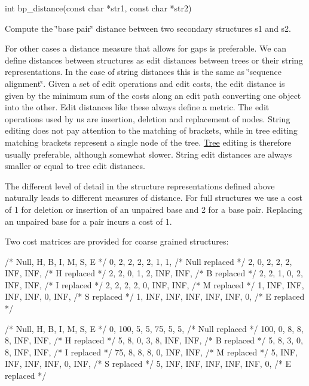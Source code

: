 \begin{DoxyVerb}
int bp_distance(const char *str1,
                const char *str2)
\end{DoxyVerb}
 Compute the \char`\"{}base pair\char`\"{} distance between two secondary structures s1 and s2. 

For other cases a distance measure that allows for gaps is preferable. We can define distances between structures as edit distances between trees or their string representations. In the case of string distances this is the same as \char`\"{}sequence alignment\char`\"{}. Given a set of edit operations and edit costs, the edit distance is given by the minimum sum of the costs along an edit path converting one object into the other. Edit distances like these always define a metric. The edit operations used by us are insertion, deletion and replacement of nodes. String editing does not pay attention to the matching of brackets, while in tree editing matching brackets represent a single node of the tree. \hyperlink{structTree}{Tree} editing is therefore usually preferable, although somewhat slower. String edit distances are always smaller or equal to tree edit distances.

The different level of detail in the structure representations defined above naturally leads to different measures of distance. For full structures we use a cost of 1 for deletion or insertion of an unpaired base and 2 for a base pair. Replacing an unpaired base for a pair incurs a cost of 1.

Two cost matrices are provided for coarse grained structures:

\begin{DoxyVerb}
/*  Null,   H,   B,   I,   M,   S,   E    */
   {   0,   2,   2,   2,   2,   1,   1},   /* Null replaced */
   {   2,   0,   2,   2,   2, INF, INF},   /* H    replaced */
   {   2,   2,   0,   1,   2, INF, INF},   /* B    replaced */
   {   2,   2,   1,   0,   2, INF, INF},   /* I    replaced */
   {   2,   2,   2,   2,   0, INF, INF},   /* M    replaced */
   {   1, INF, INF, INF, INF,   0, INF},   /* S    replaced */
   {   1, INF, INF, INF, INF, INF,   0},   /* E    replaced */


/* Null,   H,   B,   I,   M,   S,   E   */
   {   0, 100,   5,   5,  75,   5,   5},   /* Null replaced */
   { 100,   0,   8,   8,   8, INF, INF},   /* H    replaced */
   {   5,   8,   0,   3,   8, INF, INF},   /* B    replaced */
   {   5,   8,   3,   0,   8, INF, INF},   /* I    replaced */
   {  75,   8,   8,   8,   0, INF, INF},   /* M    replaced */
   {   5, INF, INF, INF, INF,   0, INF},   /* S    replaced */
   {   5, INF, INF, INF, INF, INF,   0},   /* E    replaced */
\end{DoxyVerb}


